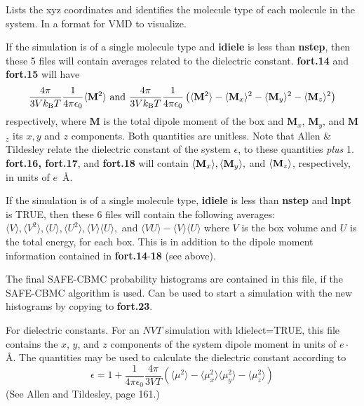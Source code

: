 \documentclass[12pt,letterpaper]{article}
\begin{document}
 Lists the xyz coordinates
and identifies the molecule type of each molecule in the
system. In a format for VMD to visualize.

If the simulation is of a single molecule type and {\bf
  idiele} is less than {\bf nstep}, then these 5 files will
contain averages related to the dielectric constant. {\bf
  fort.14} and {\bf fort.15} will have
\begin{equation}
\frac{4\pi}{3Vk_{\rm B}T} \frac{1}{4\pi\epsilon_0}
\langle {\bf M}^2\rangle
\text{  and  }
\frac{4\pi}{3Vk_{\rm B}T}\frac{1}{4\pi\epsilon_0}
\left(\langle {\bf M}^2\rangle -
\langle {\bf M}_x\rangle^2 -
\langle{\bf M}_y\rangle^2 -
\langle{\bf M}_z\rangle^2 \right)
\end{equation}
respectively, where {\bf M} is the total dipole moment of
the box and {\bf M}$_x$, {\bf M}$_y$, and {\bf M}$_z$ its
$x, y$ and $z$ components. Both quantities are unitless.
Note that Allen \& Tildesley relate the dielectric constant
of the system $\epsilon$, to these quantities {\sl plus} 1.
{\bf fort.16, fort.17}, and {\bf fort.18} will contain
$\langle{\bf M}_x\rangle, \langle{\bf M}_y\rangle,$ and
$\langle{\bf M}_z\rangle$, respectively, in units of
$e$~\AA.

If the simulation is of a single molecule type, {\bf idiele} is less
than {\bf nstep} and {\bf lnpt} is TRUE, then these 6 files will
contain the following averages: $\langle V\rangle, \langle V^2
\rangle, \langle U \rangle, \langle U^2\rangle, \langle V
\rangle\langle U \rangle,$ and $\langle VU \rangle - \langle V \rangle
\langle U \rangle$ where $V$ is the box volume and $U$ is the total
energy, for each box.  This is in addition to the dipole moment
information contained in {\bf fort.14}-{\bf 18} (see above).

 The final SAFE-CBMC probability
histograms are contained in this file, if the SAFE-CBMC
algorithm is used. Can be used to start a simulation with
the new histograms by copying to {\bf fort.23}.

 For dielectric constants. For an
$NVT$ simulation with ldielect=TRUE, this file contains
the $x$, $y$, and $z$ components of the system dipole moment
in units of $e\cdot$\AA. The quantities may be used to
calculate the dielectric constant according to
\begin{equation}
\epsilon = 1 + \frac{1}{4\pi\epsilon_0} \frac{4 \pi}{3VT} \left ( \langle \mu^2 \rangle - \langle \mu_x^2 \rangle
 \langle \mu_y^2 \rangle - \langle \mu_z^2 \rangle \right )
\end{equation}
(See Allen and Tildesley, page 161.)
\end{document}
